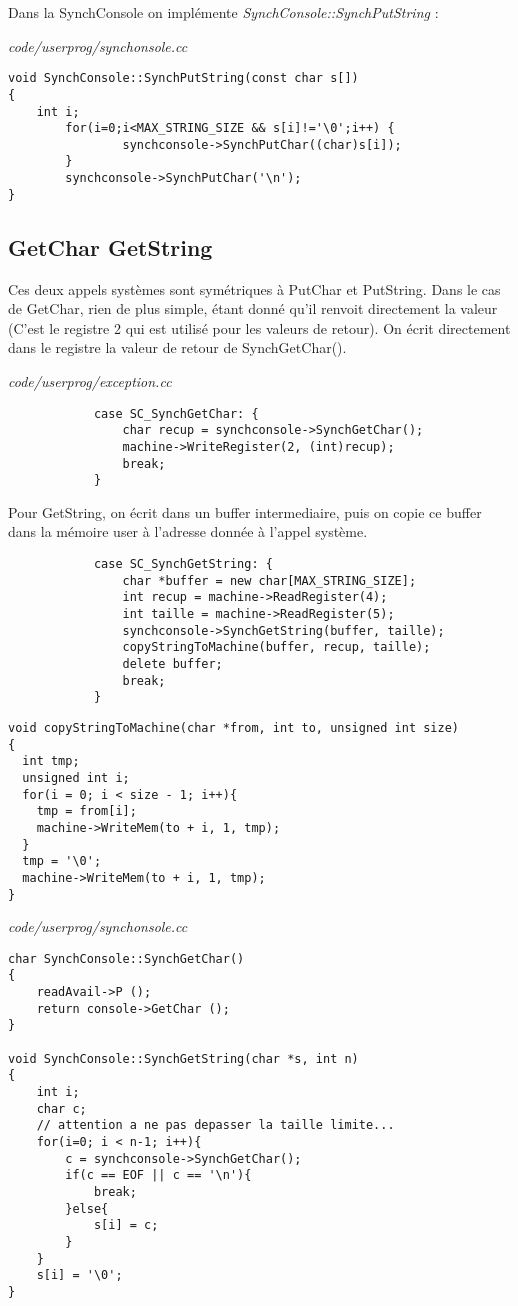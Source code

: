\documentclass[a4paper,10pt]{article}
\begin{document}
Dans la SynchConsole on implémente \textit{SynchConsole::SynchPutString} :

\textit{code/userprog/synchonsole.cc}
\begin{lstlisting}
void SynchConsole::SynchPutString(const char s[])
{
	int i;
        for(i=0;i<MAX_STRING_SIZE && s[i]!='\0';i++) {
                synchconsole->SynchPutChar((char)s[i]);
        }
        synchconsole->SynchPutChar('\n');
}
\end{lstlisting}

\subsection{GetChar GetString}

Ces deux appels systèmes sont symétriques à PutChar et PutString. Dans le cas
de GetChar, rien de plus simple, étant donné qu'il renvoit directement la
valeur (C'est le registre 2 qui est utilisé pour les valeurs de retour). On
écrit directement dans le registre la valeur de retour de SynchGetChar().

\textit{code/userprog/exception.cc}
\begin{lstlisting}
			case SC_SynchGetChar: {
				char recup = synchconsole->SynchGetChar();
				machine->WriteRegister(2, (int)recup);
				break;
			}
\end{lstlisting}

Pour GetString, on écrit dans un buffer intermediaire, puis on copie ce buffer
dans la mémoire user à l'adresse donnée à l'appel système.

\begin{lstlisting}
			case SC_SynchGetString: {
				char *buffer = new char[MAX_STRING_SIZE];
				int recup = machine->ReadRegister(4);
				int taille = machine->ReadRegister(5);
				synchconsole->SynchGetString(buffer, taille);
				copyStringToMachine(buffer, recup, taille);
				delete buffer;
				break;
			}
\end{lstlisting}

\begin{lstlisting}
void copyStringToMachine(char *from, int to, unsigned int size)
{
  int tmp;
  unsigned int i;
  for(i = 0; i < size - 1; i++){
  	tmp = from[i];
   	machine->WriteMem(to + i, 1, tmp);
  }
  tmp = '\0';
  machine->WriteMem(to + i, 1, tmp);
}
\end{lstlisting}

\textit{code/userprog/synchonsole.cc}
\begin{lstlisting}
char SynchConsole::SynchGetChar()
{
	readAvail->P ();
	return console->GetChar ();
}

void SynchConsole::SynchGetString(char *s, int n)
{
	int i;
	char c;
	// attention a ne pas depasser la taille limite...
	for(i=0; i < n-1; i++){
		c = synchconsole->SynchGetChar();
		if(c == EOF || c == '\n'){
			break;
		}else{
			s[i] = c;
		}
	}
	s[i] = '\0';
}
\end{lstlisting}
\end{document}
